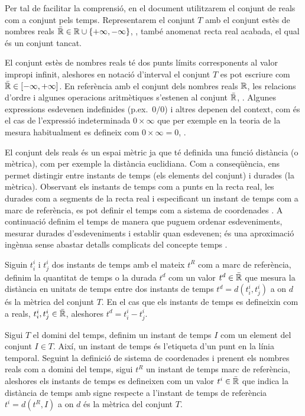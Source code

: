 Per tal de facilitar la comprensió, en el document utilitzarem el
conjunt de reals com a conjunt pels temps. Representarem el conjunt
$T$ amb el conjunt estès de nombres reals $\bar{\mathbb{R}{}} \in
\mathbb{R}{} \cup
\{+\infty,-\infty\}$, \parencite{wiki:extendedreal,cantrell:extendedreal},
també anomenat recta real acabada, el qual és un conjunt tancat.

El conjunt estès de nombres reals té dos punts límits corresponents al
valor impropi infinit, aleshores en notació d'interval el conjunt $T$
es pot escriure com $\bar{\mathbb{R}{}} \in [-\infty,+\infty]$. En referència
amb el conjunt dels nombres reals $\mathbb{R}{}$, les relacions d'ordre i
algunes operacions aritmètiques s'estenen al conjunt $\bar{\mathbb{R}{}}$,
\cite{cantrell:extendedreal}.  Algunes expressions esdevenen
indefinides (p.ex.\ $0/0$) i altres depenen del context, com és el cas
de l'expressió indeterminada $0 \times \infty$ que per exemple en la
teoria de la mesura habitualment es defineix com $0 \times \infty =
0$, \cite{wiki:extendedreal}.


El conjunt dels reals és un espai mètric ja que té definida una funció
distància (o mètrica), com per exemple la distància euclidiana. Com a
conseqüència, ens permet distingir entre instants de temps (els
elements del conjunt) i durades (la mètrica). Observant els instants
de temps com a punts en la recta real, les durades com a segments de
la recta real i especificant un instant de temps com a marc de
referència, es pot definir el temps com a sistema de
coordenades \parencite{iep:time-supplement,wiki:coordinate}. A
continuació definim el temps de manera que puguem ordenar
esdeveniments, mesurar durades d'esdeveniments i establir quan
esdevenen; és una aproximació ingènua sense abastar detalls complicats
del concepte temps \parencite{iep:time}.

\begin{definition}[Temps]
  \label{def:model:temps}
  Siguin $t^i_i$ i $t^i_j$ dos instants de temps amb el mateix $t^R$
  com a marc de referència, definim la quantitat de temps o la durada
  $t^d$ com un valor $t^d \in\bar{\mathbb{R}{}}$ que mesura la distància en
  unitats de temps entre dos instants de temps $t^d = d(t^i_i,t^i_j)$
  a on $d$ és la mètrica del conjunt $T$. En el cas que els instants
  de temps es defineixin com a reals, $t^i_i , t^i_j \in \bar{\mathbb{R}{}}$,
  aleshores $t^d = t^i_i - t^i_j$.

  Sigui $T$ el domini del temps, definim un instant de temps $I$ com
  un element del conjunt $I \in T$. Així, un instant de temps és
  l'etiqueta d'un punt en la línia temporal. Seguint la definició de
  sistema de coordenades i prenent els nombres reals com a domini del
  temps, sigui $t^{R}$ un instant de temps marc de referència,
  aleshores els instants de temps es defineixen com un valor $t^i
  \in\bar{\mathbb{R}{}}$ que indica la distància de temps amb signe respecte a
  l'instant de temps de referència $t^i= d(t^{R},I)$ a on $d$ és la
  mètrica del conjunt $T$.
\end{definition}

